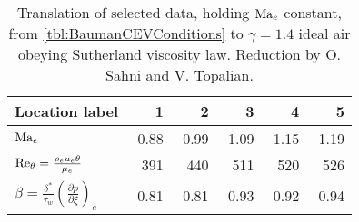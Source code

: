 \begin{table}[p]
\centering
\caption[Perfect gas boundary layer conditions based on
        fully turbulent Orion MPCV TPS simulations]{%
  Translation of selected data, holding $\Mach[e]{}$ constant, from
  \autoref{tbl:BaumanCEVConditions} to $\gamma=1.4$ ideal air obeying Sutherland
  viscosity law.  Reduction by O.  Sahni and V.
  Topalian.\label{tbl:BaumanCEVConditionsPerfect}
}
\renewcommand{\arraystretch}{1.3}
\begin{tabular}{l|rrrrr}
Location label & \hspace{7ex}1 & \hspace{7ex}2 & \hspace{7ex}3 & \hspace{7ex}4 & \hspace{7ex}5 \\
\hline
 $\Mach[e]{}$                                                                      & 0.88      & 0.99      & 1.09      & 1.15      & 1.19      \\
 $\Reynolds[\theta]{} = \frac{\rho_e u_e \theta}{\mu_e}$                           & 391       & 440       & 511       & 520       & 526       \\
 $\beta = \frac{\delta^\ast}{\tau_w}\left(\frac{\partial p}{\partial\xi}\right)_e$ & -0.81     & -0.81     & -0.93     & -0.92     & -0.94     \\
\end{tabular}
\end{table}
